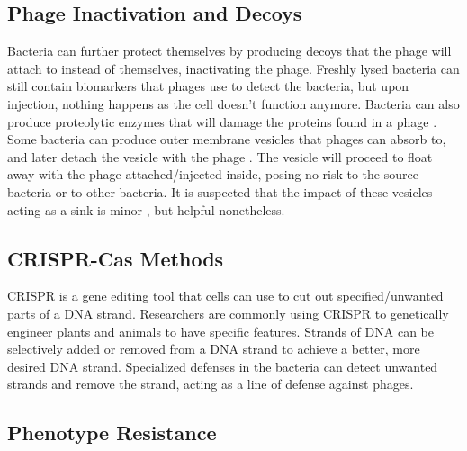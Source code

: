 \subsection{Phage Inactivation and Decoys}
Bacteria can further protect themselves by producing decoys that the phage will attach to instead of themselves, inactivating the phage. 
Freshly lysed bacteria can still contain biomarkers that phages use to detect the bacteria, but upon injection, nothing happens as the cell doesn't function anymore. 
Bacteria can also produce proteolytic enzymes that will damage the proteins found in a phage \cite{tanQuorumSensingDetermines2015}. 
Some bacteria can produce outer membrane vesicles that phages can absorb to, and later detach the vesicle with the phage \cite{rabinovitchBacterialDebrisEcological2003}. 
The vesicle will proceed to float away with the phage attached/injected inside, posing no risk to the source bacteria or to other bacteria. 
It is suspected that the impact of these vesicles acting as a sink is minor \cite{bullPhageBacterialDynamicsSpatial2018}, but helpful nonetheless. 

\subsection{CRISPR-Cas Methods}
CRISPR is a gene editing tool that cells can use to cut out specified/unwanted parts of a DNA strand. 
Researchers are commonly using CRISPR to genetically engineer plants and animals to have specific features. 
Strands of DNA can be selectively added or removed from a DNA strand to achieve a better, more desired DNA strand. 
Specialized defenses in the bacteria can detect unwanted strands and remove the strand, acting as a line of defense against phages. 

\subsection{Phenotype Resistance}

